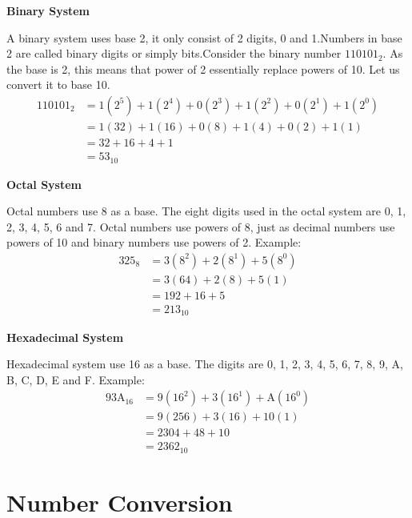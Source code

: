 \documentclass[
]{book}
\begin{document}
\textbf{Binary System}

\normalsize A binary system uses base 2, it only consist of 2 digits, 0
and 1.\newline Numbers in base 2 are called binary digits or simply
bits.\newline Consider the binary number \(110101_2\). As the base is 2,
this means that power of 2 essentially replace powers of 10. Let us
convert it to base 10. \begin{equation} \label{eq2}
\begin{split}
110101_2 & = 1(2^5)+1(2^4)+0(2^3)+1(2^2)+0(2^1)+1(2^0) \\
& = 1(32)+1(16)+0(8)+1(4)+0(2)+1(1) \\
& = 32+16+4+1 \\
& = 53_{10}
\end{split}
\end{equation}

\textbf{Octal System}

\normalsize Octal numbers use 8 as a base. The eight digits used in the
octal system are 0, 1, 2, 3, 4, 5, 6 and 7. Octal numbers use powers of
8, just as decimal numbers use powers of 10 and binary numbers use
powers of 2. Example: \begin{equation} \label{eq3}
\begin{split}
325_8 & = 3(8^2)+2(8^1)+5(8^0) \\
& = 3(64)+2(8)+5(1) \\
& = 192+16+5 \\
& = 213_{10}
\end{split}
\end{equation}

\textbf{Hexadecimal System}

\normalsize Hexadecimal system use 16 as a base. The digits are 0, 1, 2,
3, 4, 5, 6, 7, 8, 9, A, B, C, D, E and F. Example:
\begin{equation} \label{eq4}
\begin{split}
93\text{A}_{16} & = 9(16^2)+3(16^1)+\text{A}(16^0) \\
& = 9(256)+3(16)+10(1) \\
& = 2304+48+10 \\
& = 2362_{10}
\end{split}
\end{equation}

\hypertarget{number-conversion}{%
\section{Number Conversion}\label{number-conversion}}
\end{document}
